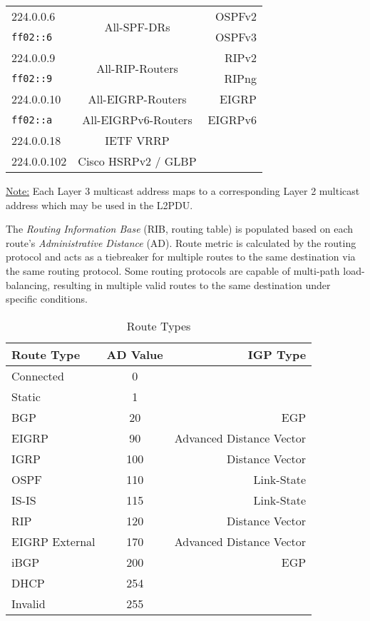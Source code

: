 \documentclass[12pt]{article}
\newif\ifcolor											%
\newcommand{\note}[1]{\ifcolor \colorbox{#1}{Note:}\else \underline{Note:}\fi}
\newcommand{\mr}[2]{\multirow{#1}{*}{#2}}
\begin{document}
\begin{table}[H]
\begin{minipage}{.6\linewidth}
\begin{tabular}{| l | c | r |}
	224.0.0.6		& \mr{2}{All-SPF-DRs}		& OSPFv2\\
	\texttt{ff02::6}	&					& OSPFv3\\\hline
	224.0.0.9		& \mr{2}{All-RIP-Routers}	& RIPv2\\
	\texttt{ff02::9}	&					& RIPng\\\hline
	224.0.0.10		& All-EIGRP-Routers		& EIGRP\\
	\texttt{ff02::a}	& All-EIGRPv6-Routers		& EIGRPv6\\\hline
	224.0.0.18		& IETF VRRP			&\\\hline
	224.0.0.102		& Cisco HSRPv2 / GLBP		&\\\hline
	\end{tabular}\end{minipage}\end{table}
	\note{Goldenrod} Each Layer 3 multicast address maps to a corresponding Layer 2 multicast address which may be used in the L2PDU.

	The \textit{Routing Information Base} (RIB, routing table) is populated based on each route's \textit{Administrative Distance} (AD). Route metric is calculated by the routing protocol and acts as a tiebreaker for multiple routes to the same destination via the same routing protocol. Some routing protocols are capable of multi-path load-balancing, resulting in multiple valid routes to the same destination under specific conditions.

	\begin{table}[H]
	\centering
	\caption{Route Types \label{tab:ROUTE TYPES}}
	\begin{tabular}{@{} l c r @{}}\hline
	\textbf{Route Type}	& \textbf{AD Value}	& \textbf{IGP Type}\\\hline
	Connected 			& 0				&\\
	Static				& 1				&\\
	BGP				& 20				& EGP\\
	EIGRP				& 90				& Advanced Distance Vector\\
	IGRP				& 100				& Distance Vector\\
	OSPF				& 110				& Link-State\\
	IS-IS				& 115				& Link-State\\
	RIP				& 120				& Distance Vector\\
	EIGRP External		& 170				& Advanced Distance Vector\\
	iBGP				& 200				& EGP\\
	DHCP			& 254				&\\
	Invalid			& 255				&\\\hline
	\end{tabular}\end{table}
\end{document}
